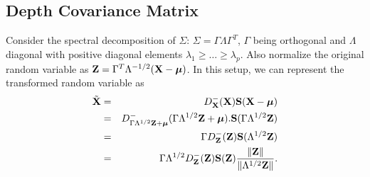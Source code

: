 

\subsection{Depth Covariance Matrix}
\label{subsec:dcm}
Consider the spectral decomposition of $\Sigma$: $\Sigma = \Gamma\Lambda\Gamma^T$, $\Gamma$ being orthogonal and $\Lambda$ diagonal with positive diagonal elements $\lambda_1 \geq \ldots \geq \lambda_p$. Also normalize the original random variable as ${\mathbf{Z}} = \Gamma^T\Lambda^{-1/2} ({\mathbf{X}} - {\boldsymbol{\mu}})$. In this setup, we can represent the transformed random variable as
%
\begin{eqnarray}
\tilde {{\mathbf{X}}} &=& D^-_{{\mathbf{X}}} ({\mathbf{X}}) {\mathbf{S}}({\mathbf{X}} - {\boldsymbol{\mu}}) \notag \\
&=& D^-_{\Gamma\Lambda^{1/2}{\mathbf{Z}} + {\boldsymbol{\mu}}} (\Gamma\Lambda^{1/2} {\mathbf{Z}} + {\boldsymbol{\mu}}). {\mathbf{S}}(\Gamma\Lambda^{1/2} {\mathbf{Z}}) \notag \\
&=& \Gamma D^-_{{\mathbf{Z}}}({\mathbf{Z}}) {\mathbf{S}}(\Lambda^{1/2}{\mathbf{Z}}) \notag \\
&=& \Gamma \Lambda^{1/2} D^-_{{\mathbf{Z}}}({\mathbf{Z}}) {\mathbf{S}}({\mathbf{Z}}) \frac{\| {\mathbf{Z}} \|}{\|\Lambda^{1/2} {\mathbf{Z}} \|}.
\label{equation:rankdecomp}
\end{eqnarray}
%

